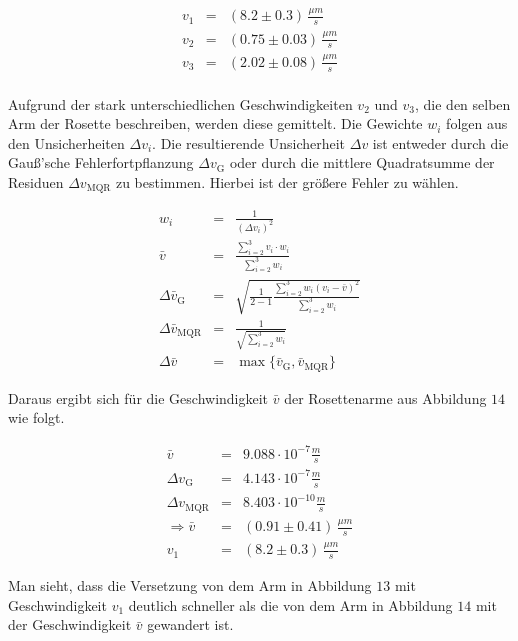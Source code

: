 \documentclass[12pt,a4paper]{scrartcl}
\numberwithin{equation}{section} %
\renewcommand{\[}{} %
\renewcommand{\]}{\noindent} %
\begin{document}
\[
\begin{eqnarray}
    v_1 &=& (8.2 \pm 0.3) \,\frac{\mu m}{s} \\
    v_2 &=& (0.75 \pm 0.03) \,\frac{\mu m}{s} \\
    v_3 &=& (2.02 \pm 0.08) \,\frac{\mu m}{s} \\
\end{eqnarray}
\]

Aufgrund der stark unterschiedlichen Geschwindigkeiten \(v_2\) und
\(v_3\), die den selben Arm der Rosette beschreiben, werden diese
gemittelt. Die Gewichte \(w_i\) folgen aus den Unsicherheiten
\(\Delta v_i\). Die resultierende Unsicherheit \(\Delta v\) ist entweder
durch die Gauß'sche Fehlerfortpflanzung \(\Delta v_\mathrm{G}\) oder
durch die mittlere Quadratsumme der Residuen \(\Delta v_\mathrm{MQR}\)
zu bestimmen. Hierbei ist der größere Fehler zu wählen.

\[
\begin{eqnarray}
    w_i &=& \frac{1}{(\Delta v_i)^2} \\
    \bar{v} &=& \frac{\sum_{i=2}^{3} v_i\cdot w_i}{\sum_{i=2}^{3} w_i} \\
    \Delta \bar{v}_\mathrm{G} &=&
        \sqrt{\frac{1}{2-1}\frac{\sum_{i=2}^{3}w_i(v_i-\bar{v})^2}{\sum_{i=2}^{3}w_i}} \\
    \Delta \bar{v}_\mathrm{MQR} & = & \frac{1}{\sqrt{\sum_{i=2}^{3}w_i}} \\
    \Delta \bar{v} &=& \max\{\bar{v}_\mathrm{G}, \bar{v}_\mathrm{MQR}\}
\end{eqnarray}
\]

Daraus ergibt sich für die Geschwindigkeit \(\bar v\) der Rosettenarme
aus Abbildung \(14\) wie folgt.

\[
\begin{eqnarray}
    \bar{v} &=& 9.088 \cdot 10^{-7} \frac{m}{s} \\
    \Delta v_\mathrm{G} &=& 4.143 \cdot 10^{-7} \frac{m}{s} \\
    \Delta v_\mathrm{MQR} &=& 8.403 \cdot 10^{-10} \frac{m}{s} \\
    \Rightarrow \bar{v} &=& (0.91 \pm 0.41) \,\frac{\mu m}{s} \\
    v_1 &=& (8.2 \pm 0.3) \,\frac{\mu m}{s}
\end{eqnarray}
\]

Man sieht, dass die Versetzung von dem Arm in Abbildung \(13\) mit
Geschwindigkeit \(v_1\) deutlich schneller als die von dem Arm in
Abbildung \(14\) mit der Geschwindigkeit \(\bar v\) gewandert ist.
\end{document}
